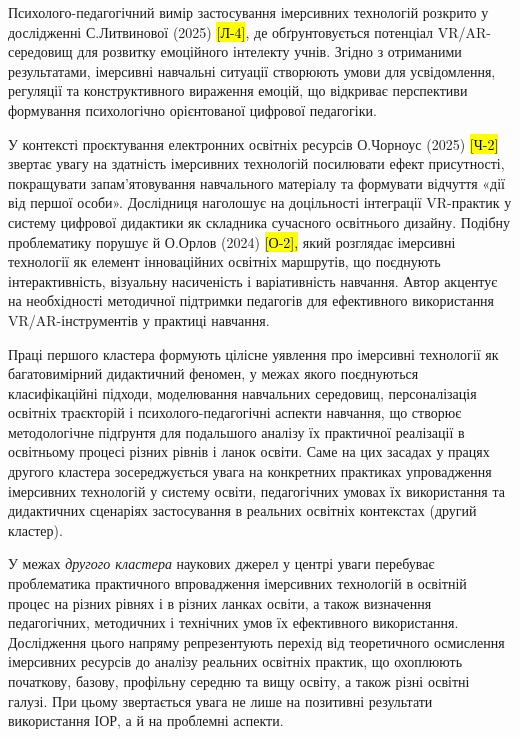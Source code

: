 Психолого-педагогічний вимір застосування імерсивних технологій розкрито у дослідженні С.Литвинової (2025) \hl{{[}Л-4{]}}, де обґрунтовується потенціал VR/AR-середовищ для розвитку емоційного інтелекту учнів. Згідно з отриманими результатами, імерсивні навчальні ситуації створюють умови для усвідомлення, регуляції та конструктивного вираження емоцій, що відкриває перспективи формування психологічно орієнтованої цифрової педагогіки.

У контексті проєктування електронних освітніх ресурсів О.Чорноус (2025) \hl{{[}Ч-2{]}} звертає увагу на здатність імерсивних технологій посилювати ефект присутності, покращувати запам'ятовування навчального матеріалу та формувати відчуття «дії від першої особи». Дослідниця наголошує на доцільності інтеграції VR-практик у систему цифрової дидактики як складника сучасного освітнього дизайну. Подібну проблематику порушує й О.Орлов (2024) \hl{{[}О-2{]},} який розглядає імерсивні технології як елемент інноваційних освітніх маршрутів, що поєднують інтерактивність, візуальну насиченість і варіативність навчання. Автор акцентує на необхідності методичної підтримки педагогів для ефективного використання VR/AR-інструментів у практиці навчання.

Праці першого кластера формують цілісне уявлення про імерсивні технології як багатовимірний дидактичний феномен, у межах якого поєднуються класифікаційні підходи, моделювання навчальних середовищ, персоналізація освітніх траєкторій і психолого-педагогічні аспекти навчання, що створює методологічне підґрунтя для подальшого аналізу їх практичної реалізації в освітньому процесі різних рівнів і ланок освіти. Саме на цих засадах у працях другого кластера зосереджується увага на конкретних практиках упровадження імерсивних технологій у систему освіти, педагогічних умовах їх використання та дидактичних сценаріях застосування в реальних освітніх контекстах (другий кластер).

У межах \emph{другого кластера} наукових джерел у центрі уваги перебуває проблематика практичного впровадження імерсивних технологій в освітній процес на різних рівнях і в різних ланках освіти, а також визначення педагогічних, методичних і технічних умов їх ефективного використання. Дослідження цього напряму репрезентують перехід від теоретичного осмислення імерсивних ресурсів до аналізу реальних освітніх практик, що охоплюють початкову, базову, профільну середню та вищу освіту, а також різні освітні галузі. При цьому звертається увага не лише на позитивні результати використання ІОР, а й на проблемні аспекти.

